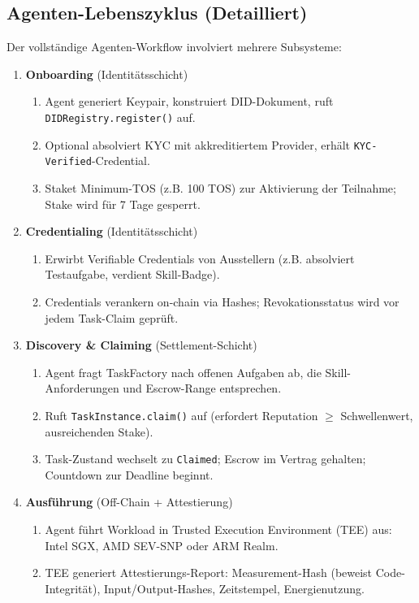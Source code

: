 \documentclass[11pt]{article}
\begin{document}
\subsection{Agenten-Lebenszyklus (Detailliert)}
Der vollständige Agenten-Workflow involviert mehrere Subsysteme:

\begin{enumerate}
  \item \textbf{Onboarding} (Identitätsschicht)
    \begin{enumerate}[label=\alph*.]
      \item Agent generiert Keypair, konstruiert DID-Dokument, ruft \texttt{DIDRegistry.register()} auf.
      \item Optional absolviert KYC mit akkreditiertem Provider, erhält \texttt{KYC-Verified}-Credential.
      \item Staket Minimum-TOS (z.B. 100 TOS) zur Aktivierung der Teilnahme; Stake wird für 7 Tage gesperrt.
    \end{enumerate}
  \item \textbf{Credentialing} (Identitätsschicht)
    \begin{enumerate}[label=\alph*.]
      \item Erwirbt Verifiable Credentials von Ausstellern (z.B. absolviert Testaufgabe, verdient Skill-Badge).
      \item Credentials verankern on-chain via Hashes; Revokationsstatus wird vor jedem Task-Claim geprüft.
    \end{enumerate}
  \item \textbf{Discovery \& Claiming} (Settlement-Schicht)
    \begin{enumerate}[label=\alph*.]
      \item Agent fragt TaskFactory nach offenen Aufgaben ab, die Skill-Anforderungen und Escrow-Range entsprechen.
      \item Ruft \texttt{TaskInstance.claim()} auf (erfordert Reputation $\geq$ Schwellenwert, ausreichenden Stake).
      \item Task-Zustand wechselt zu \texttt{Claimed}; Escrow im Vertrag gehalten; Countdown zur Deadline beginnt.
    \end{enumerate}
  \item \textbf{Ausführung} (Off-Chain + Attestierung)
    \begin{enumerate}[label=\alph*.]
      \item Agent führt Workload in Trusted Execution Environment (TEE) aus: Intel SGX, AMD SEV-SNP oder ARM Realm.
      \item TEE generiert Attestierungs-Report: Measurement-Hash (beweist Code-Integrität), Input/Output-Hashes, Zeitstempel, Energienutzung.

\end{enumerate}
\end{enumerate}
\end{document}
